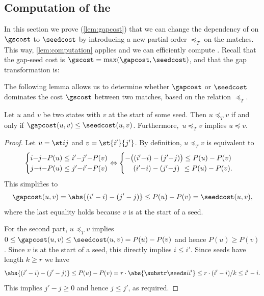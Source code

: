 \subsection{Computation of the \gch}\label{app:gapcost-proof}

In this section we prove (\cref{lem:gapcost}) that we can change the dependency of \GCH on $\gscost$
to $\seedcost$ by introducing a new partial order $\preceq_T$ on the matches.
This way, \cref{lem:computation} applies and we can efficiently compute \GCH.
Recall that the gap-seed cost is ${\gscost = \max(\gapcost,
\seedcost)}$, and that the gap transformation is:

\transformation*

The following lemma allows us to determine whether $\gapcost$ or $\seedcost$
dominates the cost $\gscost$ between two matches, based on the relation
$\preceq_T$.

\begin{lem}\label{lem:transform}%
  Let $u$ and $v$ be two states with $v$ at the start of some seed. Then $u
  \preceq_T v$ if and only if $\gapcost(u,v) \leq \seedcost(u,v)$. Furthermore,~${u \preceq_T v}$ implies $u\preceq v$.
\end{lem}
\begin{proof}
  Let $u = \st ij$ and $v = \st {i'}{j'}$. By definition, $u\preceq_T v$ is equivalent to
  \begin{equation*}
    \begin{cases}
    i {-} j {-} P(u) \leq i' {-} j' {-} P(v)\\
    j {-} i {-} P(u) \leq j' {-} i' {-} P(v)
    \end{cases}\hspace{-1em}\Leftrightarrow
    \begin{cases}
    -\big((i'{-}i)-(j'{-}j)\big) \leq P(u) - P(v)\\
    \phantom{-(}(i'{-}i)-(j'{-}j)\phantom) \leq P(u) - P(v).
    \end{cases}
  \end{equation*}
  This simplifies to
  \begin{equation*}
    \gapcost(u, v) = \abs{(i'-i) - (j'-j)} \leq P(u) - P(v) = \seedcost(u, v),
  \end{equation*}
  where the last equality holds because $v$ is at the start of a seed.

  For the second part, $u\preceq_T v$ implies
  $0\leq \gapcost(u,v)\leq \seedcost(u,v) =  P(u)-P(v)$ and hence
  $P(u) \geq P(v)$. Since $v$ is at the start of a seed, this directly implies
  $i \leq i'$.
  Since seeds have length $k\geq r$ we have
  \begin{equation*}
  \abs{(i'-i) - (j'-j)} \leq P(u)-P(v) = r\cdot \abs{\substr \seeds i{i'}} \leq r\cdot (i'-i)/k \leq i'-i.
  \end{equation*}
  This implies $j'-j\geq 0$ and hence $j\leq j'$, as required.
\end{proof}

